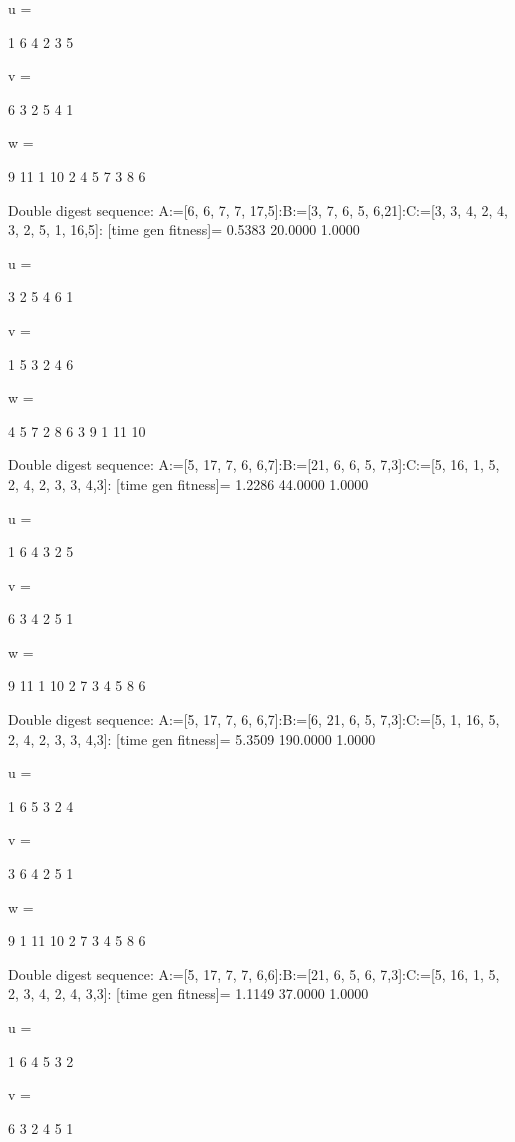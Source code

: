 u =

     1     6     4     2     3     5


v =

     6     3     2     5     4     1


w =

     9    11     1    10     2     4     5     7     3     8     6

Double digest sequence:
A:=[6, 6, 7, 7, 17,5]:B:=[3, 7, 6, 5, 6,21]:C:=[3, 3, 4, 2, 4, 3, 2, 5, 1, 16,5]:
[time gen fitness]=
    0.5383   20.0000    1.0000


u =

     3     2     5     4     6     1


v =

     1     5     3     2     4     6


w =

     4     5     7     2     8     6     3     9     1    11    10

Double digest sequence:
A:=[5, 17, 7, 6, 6,7]:B:=[21, 6, 6, 5, 7,3]:C:=[5, 16, 1, 5, 2, 4, 2, 3, 3, 4,3]:
[time gen fitness]=
    1.2286   44.0000    1.0000


u =

     1     6     4     3     2     5


v =

     6     3     4     2     5     1


w =

     9    11     1    10     2     7     3     4     5     8     6

Double digest sequence:
A:=[5, 17, 7, 6, 6,7]:B:=[6, 21, 6, 5, 7,3]:C:=[5, 1, 16, 5, 2, 4, 2, 3, 3, 4,3]:
[time gen fitness]=
    5.3509  190.0000    1.0000


u =

     1     6     5     3     2     4


v =

     3     6     4     2     5     1


w =

     9     1    11    10     2     7     3     4     5     8     6

Double digest sequence:
A:=[5, 17, 7, 7, 6,6]:B:=[21, 6, 5, 6, 7,3]:C:=[5, 16, 1, 5, 2, 3, 4, 2, 4, 3,3]:
[time gen fitness]=
    1.1149   37.0000    1.0000


u =

     1     6     4     5     3     2


v =

     6     3     2     4     5     1


